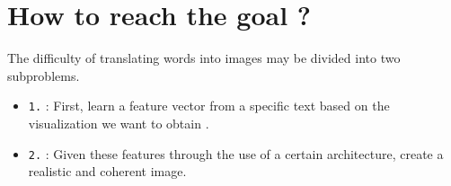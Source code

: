 \section*{How to reach the goal ?}
The difficulty of translating words into images may be 
divided into two subproblems.

\begin{itemize}[noitemsep]
    \item \texttt{1.} : 
    First, learn a feature vector from a specific text 
    based on the visualization we want to obtain .
    \item \texttt{2.} : 
    Given these features through the use of a certain architecture, 
    create a realistic and coherent image.
\end{itemize}